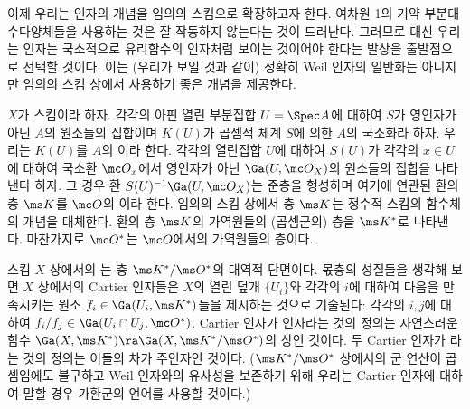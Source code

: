 	이제 우리는 인자의 개념을 임의의 스킴으로 확장하고자 한다.
	여차원 1의 기약 부분대수다양체들을 사용하는 것은 잘 작동하지 않는다는 것이 드러난다.
	그러므로 대신 우리는 인자는 국소적으로 유리함수의 인자처럼 보이는 것이어야 한다는 발상을 출발점으로 선택할 것이다.
	이는 (우리가 보일 것과 같이) 정확히 Weil 인자의 일반화는 아니지만 임의의 스킴 상에서 사용하기 좋은 개념을 제공한다.
	
	
	\begin{definition}
	$X$가 스킴이라 하자. 각각의 아핀 열린 부분집합 $U=\Spec A$에 대하여 $S$가 영인자가 아닌 $A$의 원소들의 집합이며
	$K(U)$가 곱셈적 체계 $S$에 의한 $A$의 국소화라 하자. 우리는 $K(U)$를 $A$의 이라 한다.
	각각의 열린집합 $U$에 대하여 $S(U)$가 각각의 $x\in U$에 대하여 국소환 $\mc O_x$에서 영인자가 아닌
	$\Ga(U,\mc O_X)$의 원소들의 집합을 나타낸다 하자.
	그 경우 환 $S(U)^{-1}\Ga(U,\mc O_X)$는 준층을 형성하며 여기에 연관된 환의 층 $\ms K$를
	$\mc O$의 이라 한다.
	임의의 스킴 상에서 층 $\ms K$는 정수적 스킴의 함수체의 개념을 대체한다.
	환의 층 $\ms K$의 가역원들의 (곱셈군의) 층을 $\ms K^*$로 나타낸다.
	마찬가지로 $\mc O^*$는 $\mc O$에서의 가역원들의 층이다.
	\end{definition}
	
	
	\begin{definition}
	스킴 $X$ 상에서의 는 층 $\ms K^*/\ms O^*$의 대역적 단면이다.
	몫층의 성질들을 생각해 보면 $X$ 상에서의 Cartier 인자들은 $X$의 열린 덮개 $\{U_i\}$와
	각각의 $i$에 대하여 다음을 만족시키는 원소 $f_i\in\Ga(U_i,\ms K^*)$들을 제시하는 것으로 기술된다:
	각각의 $i,j$에 대하여 $f_i/f_j\in\Ga(U_i\cap U_j,\mc O^*)$.
	Cartier 인자가 인자라는 것의 정의는 자연스러운 함수 $\Ga(X,\ms K^*)\ra\Ga(X,\ms K^*/\ms O^*)$의 상인 것이다.
	두 Cartier 인자가 라는 것의 정의는 이들의 차가 주인자인 것이다.
	($\ms K^*/\ms O^*$ 상에서의 군 연산이 곱셈임에도 불구하고 Weil 인자와의 유사성을 보존하기 위해
	우리는 Cartier 인자에 대하여 말할 경우 가환군의 언어를 사용할 것이다.)
	\end{definition}
	
